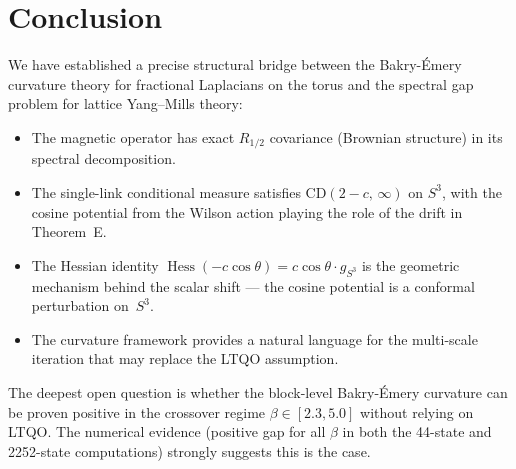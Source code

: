 \documentclass[11pt,a4paper]{article}
\theoremstyle{plain}
\theoremstyle{definition}
\theoremstyle{remark}
\newcommand{\Hess}{\operatorname{Hess}}
\begin{document}
\section{Conclusion}

We have established a precise structural bridge between the
Bakry-\'{E}mery curvature theory for fractional Laplacians on the torus
and the spectral gap problem for lattice Yang--Mills theory:

\begin{itemize}
\item The magnetic operator has exact $R_{1/2}$ covariance
  (Brownian structure) in its spectral decomposition.
\item The single-link conditional measure satisfies
  $\mathrm{CD}(2-c,\,\infty)$ on $S^3$, with the cosine potential from
  the Wilson action playing the role of the drift in Theorem~E.
\item The Hessian identity $\Hess(-c\cos\theta) = c\cos\theta \cdot
  g_{S^3}$ is the geometric mechanism behind the scalar shift --- the
  cosine potential is a conformal perturbation on~$S^3$.
\item The curvature framework provides a natural language for the
  multi-scale iteration that may replace the LTQO assumption.
\end{itemize}

The deepest open question is whether the block-level Bakry-\'{E}mery
curvature can be proven positive in the crossover regime $\beta \in
[2.3, 5.0]$ without relying on LTQO.  The numerical evidence
(positive gap for all $\beta$ in both the 44-state and 2252-state
computations) strongly suggests this is the case.
\end{document}
